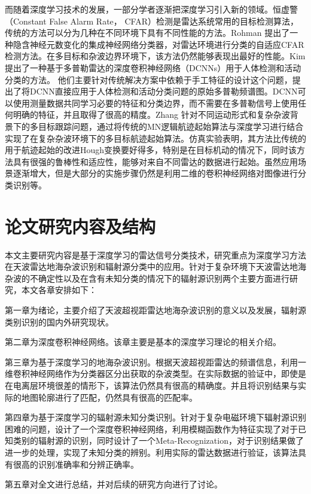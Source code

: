 而随着深度学习技术的发展，一部分学者逐渐把深度学习引入新的领域。恒虚警 （Constant False Alarm Rate， CFAR）检测是雷达系统常用的目标检测算法，传统的方法可以分为几种在不同环境下具有不同性能的方法。Rohman \cite{rohman2017classification}提出了一种隐含神经元数变化的集成神经网络分类器，对雷达环境进行分类的自适应CFAR检测方法。在多目标和杂波边界环境下，该方法仍然能够表现出最好的性能。Kim提出了一种基于多普勒雷达的深度卷积神经网络（DCNNs）用于人体检测和活动分类的方法\cite{kim2016human}。 他们主要针对传统解决方案中依赖于手工特征的设计这个问题，提出了将DCNN直接应用于人体检测和活动分类问题的原始多普勒频谱图。DCNN可以使用测量数据共同学习必要的特征和分类边界，而不需要在多普勒信号上使用任何明确的特征，并且取得了很高的精度。Zhang \cite{zhang2017novel}针对不同运动形式和复杂杂波背景下的多目标跟踪问题，通过将传统的MN逻辑航迹起始算法与深度学习进行结合实现了在复杂杂波环境下的多目标航迹起始算法。仿真实验表明，其方法比传统的用于航迹起始的改进Hough变换要好得多，特别是在目标机动的情况下，同时该方法具有很强的鲁棒性和适应性，能够对来自不同雷达的数据进行起始。虽然应用场景逐渐增大，但是大部分的实施步骤仍然是利用二维的卷积神经网络对图像进行分类识别等。

\section{论文研究内容及结构}

本文主要研究内容是基于深度学习的雷达信号分类技术，研究重点为深度学习方法在天波雷达地海杂波识别和辐射源分类中的应用。针对于复杂环境下天波雷达地海杂波的不确定性以及在含有未知分类的情况下的辐射源识别两个主要方面进行研究，本文各章安排如下：

第一章为绪论，主要介绍了天波超视距雷达地海杂波识别的意义以及发展，辐射源类别识别的国内外研究现状。

第二章为深度卷积神经网络。该章主要是基本的深度学习理论的相关介绍。

第三章为基于深度学习的地海杂波识别。根据天波超视距雷达的频谱信息，利用一维卷积神经网络作为分类器区分出获取的杂波类型。在实际数据的验证中，即使是在电离层环境很差的情形下，该算法仍然具有很高的精确度。并且将识别结果与实际的地图轮廓进行了匹配，仍然具有很高的匹配率。

第四章为基于深度学习的辐射源未知分类识别。针对于复杂电磁环境下辐射源识别困难的问题，设计了一个深度卷积神经网络，利用模糊函数作为特征实现了对于已知类别的辐射源的识别，同时设计了一个Meta-Recognization，对于识别结果做了进一步的处理，实现了未知分类的辨别。利用实际的雷达数据进行验证，该算法具有很高的识别准确率和分辨正确率。

第五章对全文进行总结，并对后续的研究方向进行了讨论。